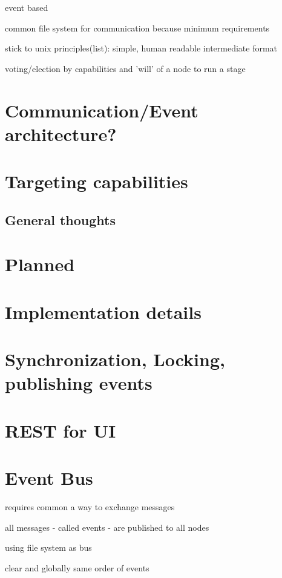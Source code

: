 event based

common file system for communication because minimum requirements

stick to unix principles(list): simple, human readable intermediate format

voting/election by capabilities and 'will' of a node to run a stage

\section{Communication/Event architecture?}

\section{Targeting capabilities}

\subsection{General thoughts}

\section{Planned}

\section{Implementation details}

\section{Synchronization, Locking, publishing events}

\section{REST for UI}



\section{Event Bus}

requires common a way to exchange messages

all messages - called events - are published to all nodes

using file system as bus

clear and globally same order of events

